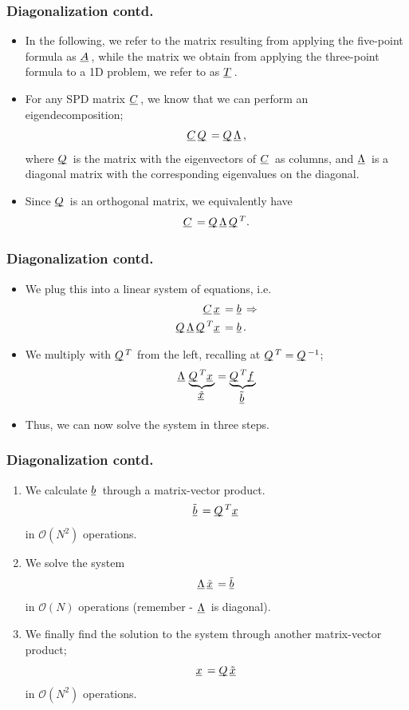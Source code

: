 \documentclass{beamer}
\newcommand{\ub}[1]{\underbar{$#1$}\,}
\begin{document}
\begin{frame}\frametitle{Diagonalization contd.}
  \begin{itemize}
    \item In the following, we refer to the matrix resulting from applying the five-point formula
      as $\ub{A}$, while the matrix we obtain from applying the three-point formula to
      a 1D problem, we refer to as $\ub{T}$.
    \item For any SPD matrix $\ub{C}$, we know that we can perform an eigendecomposition;
      \[
        \ub{C}\ub{Q} = \ub{Q}\ub{\Lambda},
      \]
      where $\ub{Q}$ is the matrix with the eigenvectors of $\ub{C}$ as columns,
      and $\ub{\Lambda}$ is a diagonal matrix with the corresponding eigenvalues on
      the diagonal.
    \item Since $\ub{Q}$ is an orthogonal matrix, we equivalently have
      \[
        \ub{C} = \ub{Q}\ub{\Lambda}\ub{Q}^T.
      \]
  \end{itemize}
\end{frame}
\begin{frame}\frametitle{Diagonalization contd.}
  \begin{itemize}
    \item We plug this into a linear system of equations, i.e.
      \[
        \begin{split}
          \ub{C}\ub{x} &= \ub{b} \Rightarrow \\
          \ub{Q}\ub{\Lambda}\ub{Q}^T\ub{x} &= \ub{b}.
        \end{split}
      \]
    \item We multiply with $\ub{Q}^T$ from the left,
          recalling at $\ub{Q}^T = \ub{Q}^{-1}$;
      \[
        \ub{\Lambda}\underbrace{\ub{Q}^T\ub{x}}_{\tilde{\ub{x}}} = \underbrace{\ub{Q}^T\ub{f}}_{\ub{\tilde{b}}}
      \]
    \item Thus, we can now solve the system in three steps.
  \end{itemize}
\end{frame}
\begin{frame}\frametitle{Diagonalization contd.}
  \begin{enumerate}
    \item We calculate $\ub{b}$ through a matrix-vector product.
      \[
        \ub{\tilde{b}} = \ub{Q}^T\ub{x}
      \]
      in $\mathcal{O}\left(N^2\right)$ operations.
    \item We solve the system
      \[
        \ub{\Lambda}\ub{\tilde{x}} = \ub{\tilde{b}}
      \]
      in $\mathcal{O}\left(N\right)$ operations (remember - $\ub{\Lambda}$ is diagonal).
    \item We finally find the solution to the system through another matrix-vector product;
      \[
        \ub{x} = \ub{Q}\ub{\tilde{x}}
      \]
      in $\mathcal{O}\left(N^2\right)$ operations.
  \end{enumerate}
\end{frame}
\end{document}
